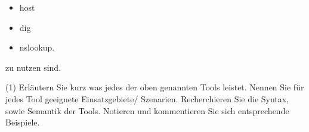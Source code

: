 \documentclass[paper=a4,fontsize=11pt]{scrartcl}%
\numberwithin{equation}{section}
\begin{document}
\begin{enumerate}
	\begin{multicols}{3}
	\begin{itemize}
	\item host
	\item dig
	\item nslookup.
	\end{itemize}
	\end{multicols}
	zu nutzen sind.
	\begin{tasks}(1)
		\task Erläutern Sie kurz was jedes der oben genannten Tools leistet.
		\task Nennen Sie für jedes Tool geeignete Einsatzgebiete/ Szenarien.
		\task Recherchieren Sie die Syntax, sowie Semantik der Tools.
		\task Notieren und kommentieren Sie sich entsprechende Beispiele. 
	\end{tasks}
\end{enumerate}
\end{document}
